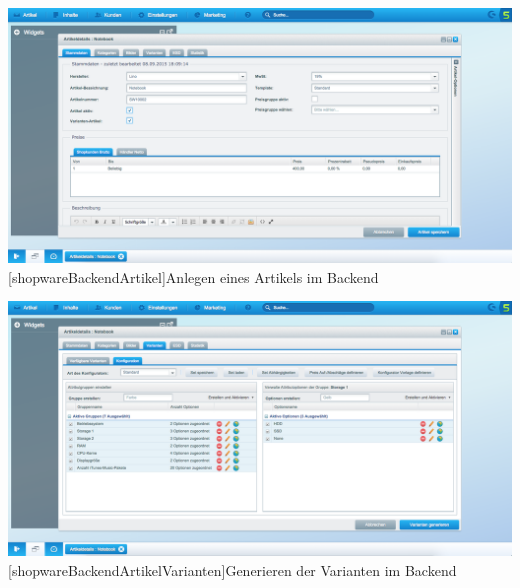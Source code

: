 \begin{appendix}
\vspace{1em}
\begin{minipage}{\linewidth}
	\centering
	\includegraphics[width=1\linewidth]{Abbildungen/shopwareBackendArtikel.png}
	[shopwareBackendArtikel]{Anlegen eines Artikels im Backend}
	\label{app:shopwareBackendArtikel}
\end{minipage}
\vspace{1em}

\vspace{1em}
\begin{minipage}{\linewidth}
	\centering
	\includegraphics[width=1\linewidth]{Abbildungen/shopwareBackendArtikelVarianten.png}
	[shopwareBackendArtikelVarianten]{Generieren der Varianten im Backend}
	\label{app:shopwareBackendArtikelVarianten}
\end{minipage}
\vspace{1em}


\end{appendix}

